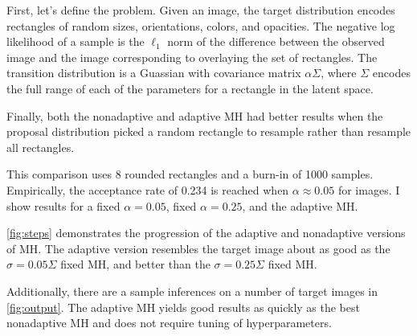 \documentclass[11pt]{article}
\begin{document}
First, let's define the problem. Given an image, the target distribution encodes rectangles of random sizes, orientations, colors, and opacities. The negative log likelihood of a sample is the $\ell_1$ norm of the difference between the observed image and the image corresponding to overlaying the set of rectangles. The transition distribution is a Guassian with covariance matrix $\alpha\Sigma$, where $\Sigma$ encodes the full range of each of the parameters for a rectangle in the latent space.

Finally, both the nonadaptive and adaptive MH had better results when the proposal distribution picked a random rectangle to resample rather than resample all rectangles.

This comparison uses 8 rounded rectangles and a burn-in of 1000 samples. Empirically, the acceptance rate of 0.234 is reached when $\alpha\approx0.05$ for images. I show results for a fixed $\alpha=0.05$, fixed $\alpha=0.25$, and the adaptive MH.

\cref{fig:steps} demonstrates the progression of the adaptive and nonadaptive versions of MH. The adaptive version resembles the target image about as good as the $\sigma=0.05\Sigma$ fixed MH, and better than the $\sigma=0.25\Sigma$ fixed MH.

Additionally, there are a sample inferences on a number of target images in \cref{fig:output}. The adaptive MH yields good results as quickly as the best nonadaptive MH and does not require tuning of hyperparameters.
\end{document}
